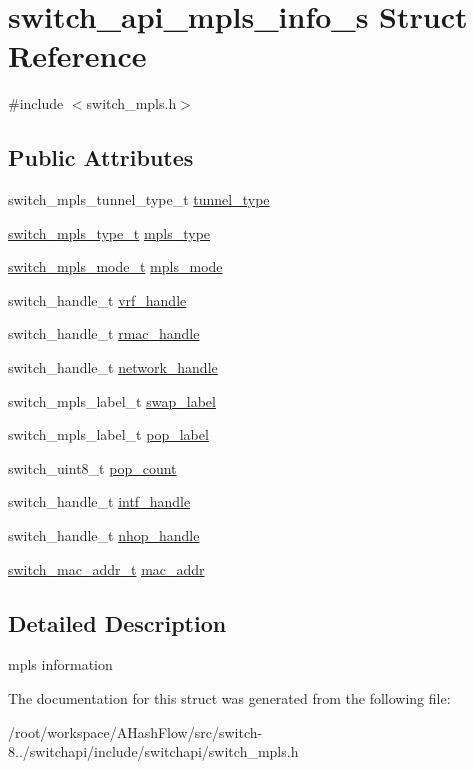 \hypertarget{structswitch__api__mpls__info__s}{\section{switch\+\_\+api\+\_\+mpls\+\_\+info\+\_\+s Struct Reference}
\label{structswitch__api__mpls__info__s}
}


{\ttfamily \#include $<$switch\+\_\+mpls.\+h$>$}

\subsection*{Public Attributes}
\begin{DoxyCompactItemize}
\item 
switch\+\_\+mpls\+\_\+tunnel\+\_\+type\+\_\+t \hyperlink{group__Tunnel_ga2f8e73c9ca6cc1282e923f8e3ca982e5}{tunnel\+\_\+type}
\item 
\hyperlink{group__Tunnel_ga9757d049be2922674f9c5350384ff3ae}{switch\+\_\+mpls\+\_\+type\+\_\+t} \hyperlink{group__Tunnel_gaaba85ce3e34b028c217449796c83d6f0}{mpls\+\_\+type}
\item 
\hyperlink{group__Tunnel_ga31b707543626fd0d899f011a2bf91fc9}{switch\+\_\+mpls\+\_\+mode\+\_\+t} \hyperlink{group__Tunnel_ga74f8a7c6cdb442d448911935d40a43a0}{mpls\+\_\+mode}
\item 
switch\+\_\+handle\+\_\+t \hyperlink{group__Tunnel_ga93781a9c1fb024b92c97056e2c95cc9d}{vrf\+\_\+handle}
\item 
switch\+\_\+handle\+\_\+t \hyperlink{group__Tunnel_gae87675e11f4c9787d9937f500bfbc914}{rmac\+\_\+handle}
\item 
switch\+\_\+handle\+\_\+t \hyperlink{group__Tunnel_gac651442108f51cc85587aafe8d7838a9}{network\+\_\+handle}
\item 
switch\+\_\+mpls\+\_\+label\+\_\+t \hyperlink{group__Tunnel_ga8d085b3d34b94d8f7d454f218d4383ae}{swap\+\_\+label}
\item 
switch\+\_\+mpls\+\_\+label\+\_\+t \hyperlink{group__Tunnel_ga6c0a6fe3e1634d7041b2812d232f9fe2}{pop\+\_\+label}
\item 
switch\+\_\+uint8\+\_\+t \hyperlink{group__Tunnel_gaf0d8b8fada5e6ac49400245cafe38524}{pop\+\_\+count}
\item 
switch\+\_\+handle\+\_\+t \hyperlink{group__Tunnel_ga8d7c143424c5cb897e18e749ef9aaff7}{intf\+\_\+handle}
\item 
switch\+\_\+handle\+\_\+t \hyperlink{group__Tunnel_ga78469526e456f991248a2cd545be8008}{nhop\+\_\+handle}
\item 
\hyperlink{structswitch__mac__addr__s}{switch\+\_\+mac\+\_\+addr\+\_\+t} \hyperlink{group__Tunnel_ga62f1b9c744e029bab8e5688751f3f347}{mac\+\_\+addr}
\end{DoxyCompactItemize}


\subsection{Detailed Description}
mpls information 

The documentation for this struct was generated from the following file\+:\begin{DoxyCompactItemize}
\item 
/root/workspace/\+A\+Hash\+Flow/src/switch-\/8../switchapi/include/switchapi/switch\+\_\+mpls.\+h\end{DoxyCompactItemize}
